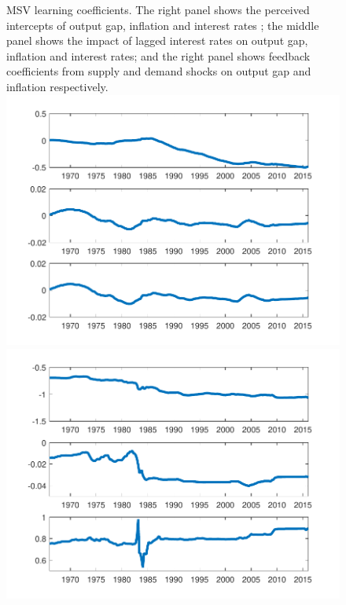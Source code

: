 \documentclass[12pt,reqno]{article}
\numberwithin{equation}{section}
\begin{document}
\begin{figure}[H]
{MSV learning coefficients. The right panel shows the perceived intercepts of output gap, inflation and interest rates ; the middle panel shows the impact of lagged interest rates on output gap, inflation and interest rates; and the right panel shows feedback coefficients from supply and demand shocks on output gap and inflation respectively. }\\
\includegraphics[scale=0.35]{NKPC_ree_init_MSV_alphas.pdf}
\includegraphics[scale=0.35]{NKPC_ree_init_MSV_betas.pdf}

\end{figure}
\end{document}
